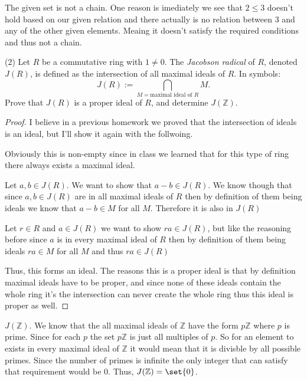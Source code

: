 \documentclass[12pt]{article}
\DeclarePairedDelimiter\set\{\}
\newcommand      {\Z}         {{\mathbb Z}}
\begin{document}
The given set is not a chain. One reason is imediately we see that $2\leq 3$ doesn't hold based on our given relation and there actually is no relation between 3 and any of the other given elements. Meaing it doesn't satisfy the required conditions and thus not a chain. 

\newpage
(2) Let $R$ be a commutative ring with $1\neq 0$. The \textit{Jacobson radical} of $R$, denoted $J(R)$, is defined as the intersection of all maximal ideals of $R$. In symbols:
\begin{equation*}
	J(R):=\bigcap_{M=\text{maximal ideal of }R} M.
\end{equation*}
Prove that $J(R)$ is a proper ideal of $R$, and determine $J(\Z)$.
\begin{proof}
	I believe in a previous homework we proved that the intersection of ideals is an ideal, but I'll show it again with the follwoing. 

	Obviously this is non-empty since in class we learned that for this type of ring there always exists a maximal ideal. 

	Let $a,b \in J(R)$. We want to show that $a-b \in J(R)$. We know though that since $a,b\in J(R)$ are in all maximal ideals of $R$ then by definition of them being ideals we know that $a-b \in M$ for all $M$. Therefore it is also in $J(R)$

	Let $r \in R$ and $a\in J(R)$ we want to show $ra \in J(R)$, but like the reasoning before since $a$ is in every maximal ideal of $R$ then by definition of them being ideals $ra \in M$ for all $M$ and thus $ra\in J(R)$ 

	Thus, this forms an ideal. The reasons this is a proper ideal is that by definition maximal ideals have to be proper, and since none of these ideals contain the whole ring it's the intersection can never create the whole ring thus this ideal is proper as well. 
\end{proof}

$J(\Z)$. We know that the all maximal ideals of $\Z$ have the form $p\Z$ where $p$ is prime. Since for each $p$ the set $p\Z$ is just all multiples of $p$. So for an element to exists in every maximal ideal of $\Z$ it would mean that it is divisble by all possible primes. Since the number of primes is infinite the only integer that can satisfy that requirement would be $0$. Thus, $J(\Z) = \set{0}$.
\end{document}
